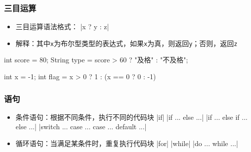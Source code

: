 \begin{frame}
  \frametitle{}
\end{frame}

\begin{frame}
  \frametitle{}
\end{frame}

\begin{frame}
  \frametitle{}
\end{frame}

\begin{frame}[fragile]
  \frametitle{三目运算}
  \begin{itemize}
    \item 三目运算语法格式：
     \java|x ? y : z|
    \item 解释：其中\texttt{x}为布尔型类型的表达式，如果\texttt{x}为真，则返回\texttt{y}；否则，返回\texttt{z}
  \end{itemize}
  
  \begin{javacode}
  int score = 80;
  String type = score > 60 ? "及格" : "不及格"; 
  
  int x = -1;
  int flag =  x > 0 ? 1 : (x == 0 ? 0 : -1)
  \end{javacode}

\end{frame}

\begin{frame}
  \frametitle{语句}
  \begin{itemize}
    \item 条件语句：根据不同条件，执行不同的代码块
      \java|if|
      \java|if ... else ...|
      \java|if ... else if ... else ...|
      \java|switch ... case ... case ... default ...|
    \item 循环语句：当满足某条件时，重复执行代码块
      \java |for|
      \java |while|
      \java |do ... while ...|
  \end{itemize}

\end{frame}

